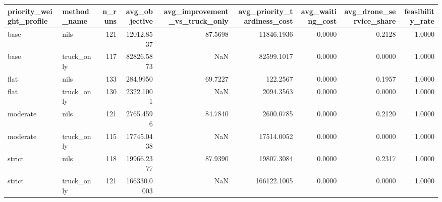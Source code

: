 \begin{tabular}{llrrrrrrr}
\toprule
priority_weight_profile & method_name & n_runs & avg_objective & avg_improvement_vs_truck_only & avg_priority_tardiness_cost & avg_waiting_cost & avg_drone_service_share & feasibility_rate \\
\midrule
base & nils & 121 & 12012.8537 & 87.5698 & 11846.1936 & 0.0000 & 0.2128 & 1.0000 \\
base & truck_only & 117 & 82826.5873 & NaN & 82599.1017 & 0.0000 & 0.0000 & 1.0000 \\
flat & nils & 133 & 284.9950 & 69.7227 & 122.2567 & 0.0000 & 0.1957 & 1.0000 \\
flat & truck_only & 130 & 2322.1001 & NaN & 2094.3563 & 0.0000 & 0.0000 & 1.0000 \\
moderate & nils & 121 & 2765.4596 & 84.7840 & 2600.0785 & 0.0000 & 0.2120 & 1.0000 \\
moderate & truck_only & 115 & 17745.0438 & NaN & 17514.0052 & 0.0000 & 0.0000 & 1.0000 \\
strict & nils & 118 & 19966.2377 & 87.9390 & 19807.3084 & 0.0000 & 0.2317 & 1.0000 \\
strict & truck_only & 121 & 166330.0003 & NaN & 166122.1005 & 0.0000 & 0.0000 & 1.0000 \\
\bottomrule
\end{tabular}
